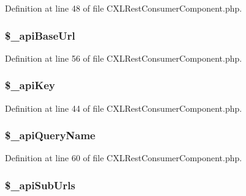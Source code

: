 Definition at line 48 of file CXLRestConsumerComponent.php.

\hypertarget{classCXLRestConsumerComponent_a2a3098653897c46b33497dd90b807f64}{
\subsubsection[{\$\_\-apiBaseUrl}]{\setlength{\rightskip}{0pt plus 5cm}\$\_\-apiBaseUrl}}
\label{classCXLRestConsumerComponent_a2a3098653897c46b33497dd90b807f64}


Definition at line 56 of file CXLRestConsumerComponent.php.

\hypertarget{classCXLRestConsumerComponent_a30d859488ed1921f08a7e8191363d9a4}{
\subsubsection[{\$\_\-apiKey}]{\setlength{\rightskip}{0pt plus 5cm}\$\_\-apiKey}}
\label{classCXLRestConsumerComponent_a30d859488ed1921f08a7e8191363d9a4}


Definition at line 44 of file CXLRestConsumerComponent.php.

\hypertarget{classCXLRestConsumerComponent_adb92b727d9e245493a2001eca37693de}{
\subsubsection[{\$\_\-apiQueryName}]{\setlength{\rightskip}{0pt plus 5cm}\$\_\-apiQueryName}}
\label{classCXLRestConsumerComponent_adb92b727d9e245493a2001eca37693de}


Definition at line 60 of file CXLRestConsumerComponent.php.

\hypertarget{classCXLRestConsumerComponent_aee5e6cb1a983f0bd5f57cefdd5a97241}{
\subsubsection[{\$\_\-apiSubUrls}]{\setlength{\rightskip}{0pt plus 5cm}\$\_\-apiSubUrls}}
\label{classCXLRestConsumerComponent_aee5e6cb1a983f0bd5f57cefdd5a97241}



